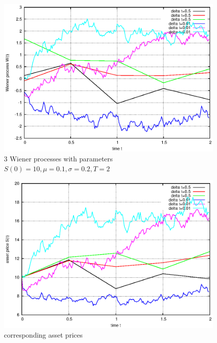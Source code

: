 \documentclass[]{article}
\begin{document}
\begin{figure}[!ht]
\centering
\includegraphics{task10_w}
\caption{3 Wiener processes with parameters $S(0)=10,\mu=0.1,\sigma=0.2,T=2$}
\label{fig:Task10a}
\end{figure}

\begin{figure}[!ht]
\centering
\includegraphics{task10_s}
\caption{corresponding asset prices}
\label{fig:Task10b}
\end{figure}
\clearpage
\end{document}
